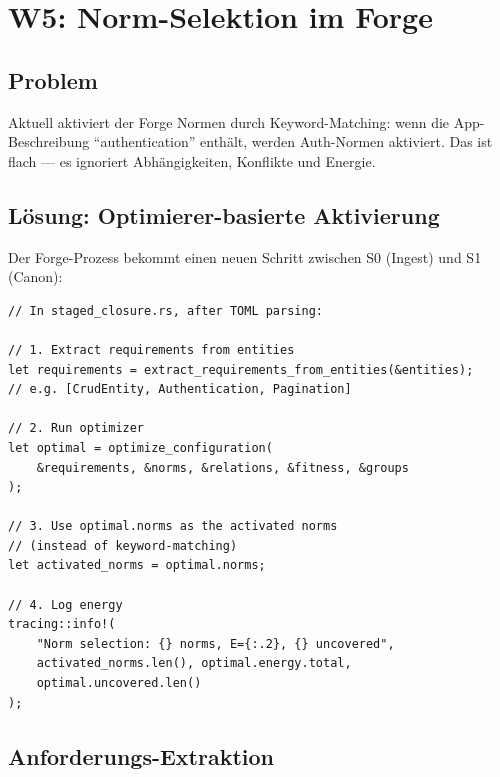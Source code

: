 \documentclass[11pt,a4paper]{article}
\begin{document}
\section{W5: Norm-Selektion im Forge}
\label{sec:w5}

\subsection{Problem}

Aktuell aktiviert der Forge Normen durch Keyword-Matching: wenn die App-Beschreibung ``authentication'' enth\"alt, werden Auth-Normen aktiviert. Das ist flach --- es ignoriert Abh\"angigkeiten, Konflikte und Energie.

\subsection{L\"osung: Optimierer-basierte Aktivierung}

Der Forge-Prozess bekommt einen neuen Schritt zwischen S0 (Ingest) und S1 (Canon):

\begin{lstlisting}[style=rust]
// In staged_closure.rs, after TOML parsing:

// 1. Extract requirements from entities
let requirements = extract_requirements_from_entities(&entities);
// e.g. [CrudEntity, Authentication, Pagination]

// 2. Run optimizer
let optimal = optimize_configuration(
    &requirements, &norms, &relations, &fitness, &groups
);

// 3. Use optimal.norms as the activated norms
// (instead of keyword-matching)
let activated_norms = optimal.norms;

// 4. Log energy
tracing::info!(
    "Norm selection: {} norms, E={:.2}, {} uncovered",
    activated_norms.len(), optimal.energy.total, 
    optimal.uncovered.len()
);
\end{lstlisting}

\subsection{Anforderungs-Extraktion}
\end{document}

